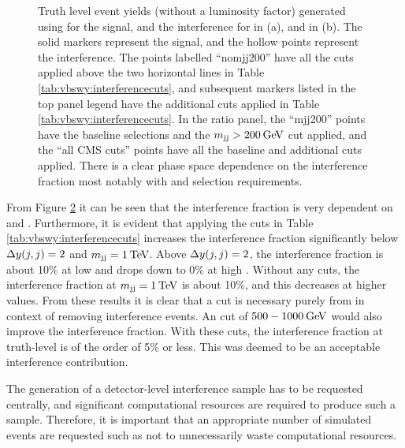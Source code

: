 \begin{figure}[t]
\begin{subfigure}[b]{0.48\textwidth}
    \caption{}
    \label{fig:vbswyint:b}
\end{subfigure}
\caption{Truth level event yields (without a luminosity factor) generated using  for the \ewwy signal, and the interference for \mjj in (a), and \dyjj in (b). The solid markers represent the \ewwy signal, and the hollow points represent the interference. The points labelled ``\tu nomjj200'' have all the cuts applied above the two horizontal lines in Table \ref{tab:vbswy:interferencecuts}, and subsequent markers listed in the top panel legend have the additional cuts applied in Table \ref{tab:vbswy:interferencecuts}. In the ratio panel, the ``mjj200'' points have the baseline selections and the $m_{\text{jj}}>200\hspace{2pt}\text{Ge\kern -0.1em V}$ cut applied, and the ``all CMS cuts'' points have all the baseline and additional cuts applied. There is a clear phase space dependence on the interference fraction most notably with \mjj and \dyjj selection requirements.\label{fig:vbswy:intcomp}}%
\end{figure}

From Figure \ref{fig:vbswy:intcomp} it can be seen that the interference fraction is very dependent on \mjj and \dyjj. Furthermore, it is evident that applying the cuts in Table \ref{tab:vbswy:interferencecuts} increases the interference fraction significantly below $\Delta y(j,j)=2$ and $m_{\text{jj}}=1\hspace{2pt}\text{Te\kern -0.1em V}$. Above $\Delta y(j,j)=2$, the interference fraction is about 10\% at low \dyjj and drops down to 0\% at high \dyjj. Without any \dyjj cuts, the interference fraction at $m_{\text{jj}}=1\hspace{2pt}\text{Te\kern -0.1em V}$ is about 10\%, and this decreases at higher \mjj values. From these results it is clear that a \dyjj cut is necessary purely from in context of removing interference events. An \mjj cut of $500-1000\hspace{2pt}\text{Ge\kern -0.1em V}$ would also improve the interference fraction. With these cuts, the interference fraction at truth-level is of the order of 5\% or less. This was deemed to be an acceptable interference contribution.

The generation of a detector-level interference sample has to be requested centrally, and significant computational resources are required to produce such a sample. Therefore, it is important that an appropriate number of simulated events are requested such as not to unnecessarily waste computational resources.
%

